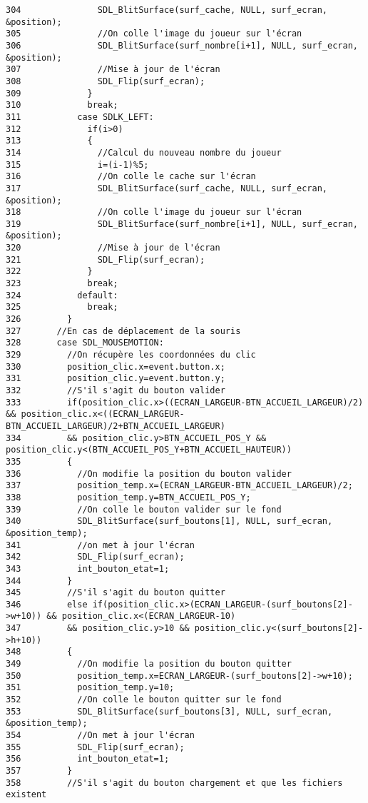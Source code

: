 \begin{Code}
\begin{verbatim}
304               SDL_BlitSurface(surf_cache, NULL, surf_ecran, &position);
305               //On colle l'image du joueur sur l'écran
306               SDL_BlitSurface(surf_nombre[i+1], NULL, surf_ecran, &position);
307               //Mise à jour de l'écran
308               SDL_Flip(surf_ecran);
309             }
310             break;
311           case SDLK_LEFT:
312             if(i>0)
313             {
314               //Calcul du nouveau nombre du joueur
315               i=(i-1)%5;
316               //On colle le cache sur l'écran
317               SDL_BlitSurface(surf_cache, NULL, surf_ecran, &position);
318               //On colle l'image du joueur sur l'écran
319               SDL_BlitSurface(surf_nombre[i+1], NULL, surf_ecran, &position);
320               //Mise à jour de l'écran
321               SDL_Flip(surf_ecran);
322             }
323             break;
324           default:
325             break;
326         }
327       //En cas de déplacement de la souris
328       case SDL_MOUSEMOTION:
329         //On récupère les coordonnées du clic
330         position_clic.x=event.button.x;
331         position_clic.y=event.button.y;
332         //S'il s'agit du bouton valider
333         if(position_clic.x>((ECRAN_LARGEUR-BTN_ACCUEIL_LARGEUR)/2) && position_clic.x<((ECRAN_LARGEUR-BTN_ACCUEIL_LARGEUR)/2+BTN_ACCUEIL_LARGEUR)
334         && position_clic.y>BTN_ACCUEIL_POS_Y && position_clic.y<(BTN_ACCUEIL_POS_Y+BTN_ACCUEIL_HAUTEUR))
335         {
336           //On modifie la position du bouton valider
337           position_temp.x=(ECRAN_LARGEUR-BTN_ACCUEIL_LARGEUR)/2;
338           position_temp.y=BTN_ACCUEIL_POS_Y;
339           //On colle le bouton valider sur le fond
340           SDL_BlitSurface(surf_boutons[1], NULL, surf_ecran, &position_temp);
341           //on met à jour l'écran
342           SDL_Flip(surf_ecran);
343           int_bouton_etat=1;
344         }
345         //S'il s'agit du bouton quitter
346         else if(position_clic.x>(ECRAN_LARGEUR-(surf_boutons[2]->w+10)) && position_clic.x<(ECRAN_LARGEUR-10)
347         && position_clic.y>10 && position_clic.y<(surf_boutons[2]->h+10))
348         {
349           //On modifie la position du bouton quitter
350           position_temp.x=ECRAN_LARGEUR-(surf_boutons[2]->w+10);
351           position_temp.y=10;
352           //On colle le bouton quitter sur le fond
353           SDL_BlitSurface(surf_boutons[3], NULL, surf_ecran, &position_temp);
354           //On met à jour l'écran
355           SDL_Flip(surf_ecran);
356           int_bouton_etat=1;
357         }
358         //S'il s'agit du bouton chargement et que les fichiers existent

\end{verbatim}
\end{Code}
